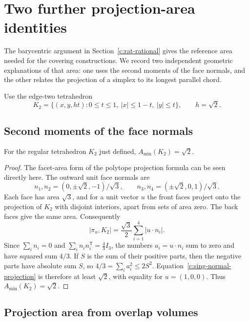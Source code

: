 \section{Two further projection-area identities}
\label{c:projection-appendix}

The barycentric argument in Section~\ref{c:rat-rational} gives the
reference area needed for the covering constructions.  We record two
independent geometric explanations of that area: one uses the second
moments of the face normals, and the other relates the projection of a
simplex to its longest parallel chord.

Use the edge-two tetrahedron
\[
 K_2=\{(x,y,ht):0\le t\le1,
                 \ |x|\le1-t,\ |y|\le t\},\qquad h=\sqrt2.
\]

\subsection{Second moments of the face normals}

\begin{lemma}\label{c:normal-frame}
For the regular tetrahedron $K_2$ just defined,
$A_{\min}(K_2)=\sqrt2$.
\end{lemma}
\begin{proof}
The facet-area form of the polytope projection formula
\cite[equation~(1), p.~83, and Section~3]{Martini1991} can be seen directly here.
The outward unit face normals are
\[
 n_1,n_2=(0,\pm\sqrt2,-1)/\sqrt3,
 \qquad n_3,n_4=(\pm\sqrt2,0,1)/\sqrt3.
\]
Each face has area $\sqrt3$, and for a unit vector $u$ the front faces
project onto the projection of $K_2$ with disjoint interiors, apart from
sets of area zero.  The back faces give the same area.  Consequently
\begin{equation}
 |\pi_{u^\perp}K_2|=\frac{\sqrt3}{2}\sum_{i=1}^4|u\cdot n_i|.
 \label{c:sing-normal-projection}
\end{equation}
Since $\sum_i n_i=0$ and $\sum_i n_i n_i^{\mathsf T}=\frac43 I_3$,
the numbers $a_i=u\cdot n_i$ sum to zero and have squared sum $4/3$.
If $S$ is the sum of their positive parts, then the negative parts have
absolute sum $S$, so $4/3=\sum_i a_i^2\le2S^2$.
Equation~\eqref{c:sing-normal-projection} is therefore at least
$\sqrt2$, with equality for $u=(1,0,0)$.  Thus $A_{\min}(K_2)=\sqrt2$.
\end{proof}

\subsection{Projection area from overlap volumes}

